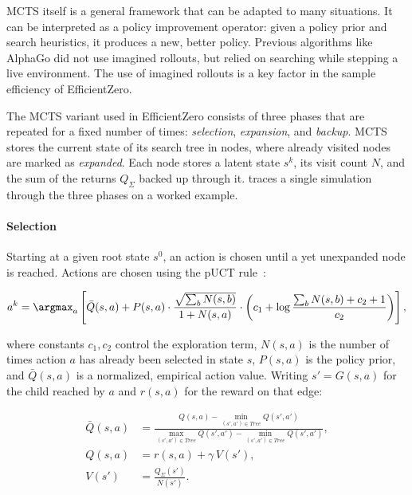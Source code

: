 MCTS itself is a general framework that can be adapted to many situations.
It can be interpreted as a policy improvement operator: given a policy prior
and search heuristics, it produces a new, better policy.
Previous algorithms like AlphaGo did not use imagined rollouts, but relied on searching
while stepping a live environment.
The use of imagined rollouts is a key factor in the sample efficiency of EfficientZero.

The MCTS variant used in EfficientZero consists of three phases that are
repeated for a fixed number of times: \emph{selection}, \emph{expansion}, and
\emph{backup}.
MCTS stores the current state of its search tree in nodes, where
already visited nodes are marked as \emph{expanded}.
Each node stores a latent state $s^k$, its visit count $N$, and the sum of the
returns $Q_\Sigma$ backed up through it.
 traces a single simulation through the three
phases on a worked example.



\paragraph{Selection}\label{sec:ez-mcts-selection}
Starting at a given root state $s^0$, an action is chosen until a yet unexpanded
node is reached.
Actions are chosen using the pUCT rule~\cite{schrittwieser_mastering_2020}:

\begin{equation}\label{eq:ez-puct}
  a^k = \argmax_a\left[
    \bar{Q}(s,a)
    + P(s,a)
      \cdot\frac{\sqrt{\sum_b N(s,b)}}{1+N(s,a)}
      \cdot\left(c_1+\log\frac{\sum_b N(s,b)+c_2+1}{c_2}\right)
  \right],
\end{equation}

where constants $c_1,c_2$ control the exploration term, $N(s,a)$ is the number
of times action $a$ has already been selected in state $s$, $P(s,a)$ is the
policy prior, and $\bar{Q}(s,a)$ is a normalized, empirical action value.
Writing $s'=G(s,a)$ for the child reached by $a$ and $r(s,a)$ for the reward on
that edge:

\begin{equation}\label{eq:ez-qnorm}
  \begin{aligned}
    \bar{Q}(s,a)
      &= \frac{Q(s,a)-\min_{(s',a')\in\mathit{Tree}} Q(s',a')}
              {\max_{(s',a')\in\mathit{Tree}} Q(s',a')-\min_{(s',a')\in\mathit{Tree}} Q(s',a')}, \\
    Q(s,a) &= r(s,a)+\gamma\,V(s'), \\
    V(s')  &= \frac{Q_\Sigma(s')}{N(s')}.
  \end{aligned}
\end{equation}

